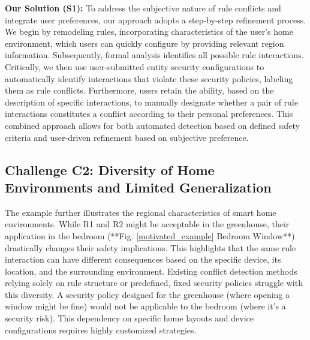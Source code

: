 \textbf{Our Solution (S1):} To address the subjective nature of rule conflicts and integrate user preferences, our approach adopts a step-by-step refinement process. We begin by remodeling rules, incorporating characteristics of the user's home environment, which users can quickly configure by providing relevant region information. Subsequently, formal analysis identifies all possible rule interactions. Critically, we then use user-submitted entity security configurations to automatically identify interactions that violate these security policies, labeling them as rule conflicts. Furthermore, users retain the ability, based on the description of specific interactions, to manually designate whether a pair of rule interactions constitutes a conflict according to their personal preferences. This combined approach allows for both automated detection based on defined safety criteria and user-driven refinement based on subjective preference.

\subsection{Challenge C2: Diversity of Home Environments and Limited Generalization}

The example further illustrates the regional characteristics of smart home environments. While R1 and R2 might be acceptable in the greenhouse, their application in the bedroom (**Fig. \ref{motivated_example}  Bedroom Window**) drastically changes their safety implications. This highlights that the same rule interaction can have different consequences based on the specific device, its location, and the surrounding environment. Existing conflict detection methods relying solely on rule structure or predefined, fixed security policies struggle with this diversity. A security policy designed for the greenhouse (where opening a window might be fine) would not be applicable to the bedroom (where it's a security risk). This dependency on specific home layouts and device configurations requires highly customized strategies.


